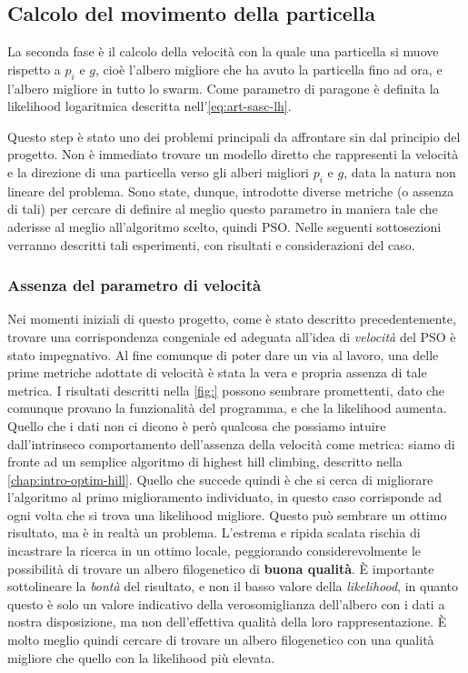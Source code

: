 \subsection{Calcolo del movimento della particella}
\label{chap:pso-adapt-calculate}
La seconda fase è il calcolo della velocità con la quale una particella si muove rispetto a $p_i$ e $g$, cioè l'albero migliore che ha avuto la particella fino ad ora, e l'albero migliore in tutto lo swarm. Come parametro di paragone è definita la likelihood logaritmica descritta nell'\autoref{eq:art-sasc-lh}.

Questo step è stato uno dei problemi principali da affrontare sin dal principio del progetto. Non è immediato trovare un modello diretto che rappresenti la velocità e la direzione di una particella verso gli alberi migliori $p_i$ e $g$, data la natura non lineare del problema. Sono state, dunque, introdotte diverse metriche (o assenza di tali) per cercare di definire al meglio questo parametro in maniera tale che aderisse al meglio all'algoritmo scelto, quindi PSO. Nelle seguenti sottosezioni verranno descritti tali esperimenti, con risultati e considerazioni del caso.

\subsubsection{Assenza del parametro di velocità}
\label{chap:pso-adapt-calculate-1}
Nei momenti iniziali di questo progetto, come è stato descritto precedentemente, trovare una corrispondenza congeniale ed adeguata all'idea di \textit{velocità} del PSO è stato impegnativo. Al fine comunque di poter dare un via al lavoro, una delle prime metriche adottate di velocità è stata la vera e propria assenza di tale metrica. I risultati descritti nella \autoref{fig:} possono sembrare promettenti, dato che comunque provano la funzionalità del programma, e che la likelihood aumenta. Quello che i dati non ci dicono è però qualcosa che possiamo intuire dall'intrinseco comportamento dell'assenza della velocità come metrica: siamo di fronte ad un semplice algoritmo di highest hill climbing, descritto nella \autoref{chap:intro-optim-hill}. Quello che succede quindi è che si cerca di migliorare l'algoritmo al primo miglioramento individuato, in questo caso corrisponde ad ogni volta che si trova una likelihood migliore. Questo può sembrare un ottimo risultato, ma è in realtà un problema. L'estrema e ripida scalata rischia di incastrare la ricerca in un ottimo locale, peggiorando considerevolmente le possibilità di trovare un albero filogenetico di \textbf{buona qualità}. È importante sottolineare la \textit{bontà} del risultato, e non il basso valore della \textit{likelihood}, in quanto questo è solo un valore indicativo della verosomiglianza dell'albero con i dati a nostra disposizione, ma non dell'effettiva qualità della loro rappresentazione. È molto meglio quindi cercare di trovare un albero filogenetico con una qualità migliore che quello con la likelihood più elevata.

